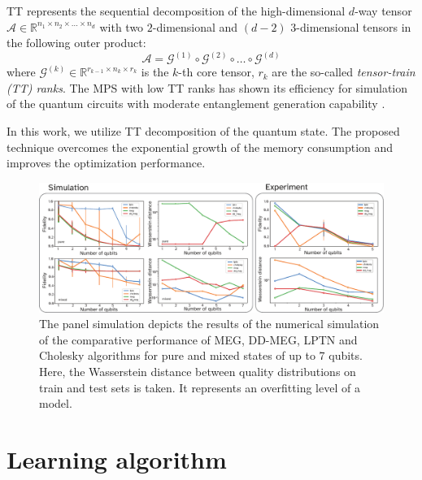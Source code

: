 \documentclass[%
 reprint,
 amsmath,amssymb,
 aps,
]{revtex4-2}
\begin{document}

TT represents the sequential decomposition of the high-dimensional $d$-way tensor $\mathcal{A}\in\mathbb{R}^{n_1\times n_2\times\dots\times n_d}$ with two $2$-dimensional and $(d-2)$ $3$-dimensional tensors in the following outer product:
\begin{equation}
    \label{eq:tt}
    \mathcal{A}=\mathcal{G}^{(1)}\circ\mathcal{G}^{(2)}\circ\dots\circ\mathcal{G}^{(d)}
\end{equation}
where $\mathcal{G}^{(k)}\in\mathbb{R}^{r_{k-1}\times n_k\times r_k}$ is the $k$-th core tensor, $r_k$ are the so-called {\itshape tensor-train (TT) ranks}. The MPS with low TT ranks has shown its efficiency for simulation of the quantum circuits with moderate entanglement generation capability \cite{Waintal2020}.

In this work, we utilize TT decomposition of the quantum state. The proposed technique overcomes the exponential growth of the memory consumption and improves the optimization performance. 

\begin{figure}[ht!]
    \centering
    \includegraphics[width = \textwidth]{img/results.pdf}
    \caption{The panel simulation depicts the results of the numerical simulation of the comparative performance of MEG, DD-MEG, LPTN and Cholesky algorithms for pure and mixed states of up to 7 qubits. Here, the Wasserstein distance between quality distributions on train and test sets is taken. It represents an overfitting level of a model.}
    \label{fig:experiment_results}
\end{figure} 

\section{\label{sec:algo}Learning algorithm}
\end{document}
